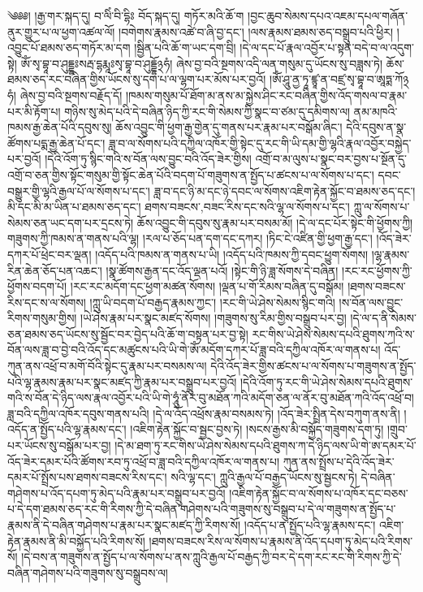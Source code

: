 ༄༅༅། །རྒྱ་གར་སྐད་དུ། བ་ལིཾ་བི་དྷིཿ བོད་སྐད་དུ། གཏོར་མའི་ཆོ་ག །བྱང་ཆུབ་སེམས་དཔའ་འཇམ་དཔལ་གཞོན་ནུར་གྱུར་པ་ལ་ཕྱག་འཚལ་ལོ། །བགེགས་རྣམས་འཚེ་བ་ཞི་བྱ་དང་། །ལས་རྣམས་ཐམས་ཅད་བསྒྲུབ་པའི་ཕྱིར། །འབྱུང་པོ་ཐམས་ཅད་གཏོར་མ་དག །སྦྱིན་པའི་ཆོ་ག་ཡང་དག་བྲི། །དེ་ལ་དང་པོ་རྣལ་འབྱོར་པ་སྟན་བདེ་བ་ལ་འདུག་སྟེ། ཨོཾ་སྭ་བྷཱ་བ་ཤུདྡྷཿསརྦ་དྷརྨཱཿསྭ་བྷཱ་བ་ཤུདྡྷོ྅ཧཾ། ཞེས་བྱ་བའི་སྔགས་འདི་ལན་གསུམ་དུ་ཡོངས་སུ་བཟླས་ཏེ། ཆོས་ཐམས་ཅད་རང་བཞིན་གྱིས་ཡོངས་སུ་དག་པ་ལ་ལྷག་པར་མོས་པར་བྱའོ། །ཨོཾ་ཤཱུ་ནྱ་ཏཱ་ཛྙཱ་ན་བཛྲ་སྭ་བྷཱ་བ་ཨཱཏྨ་ཀོ྅ཧཾ། ཞེས་བྱ་བའི་སྔགས་བརྗོད་དོ། །ཁམས་གསུམ་པོ་ཐོག་མ་ནས་མ་སྐྱེས་ཤིང་རང་བཞིན་གྱིས་འོད་གསལ་བ་རྣམ་པར་མི་རྟོག་པ། གཉིས་སུ་མེད་པའི་དེ་བཞིན་ཉིད་ཀྱི་རང་གི་སེམས་ཀྱི་སྣང་བ་ཙམ་དུ་དམིགས་ལ། ནམ་མཁའི་ཁམས་རྒྱ་ཆེན་པོའི་དབུས་སུ། ཆོས་འབྱུང་གི་ཕྱག་རྒྱ་གྱེན་དུ་གནས་པར་རྣམ་པར་བསྒོམ་ཞིང་། དེའི་དབུས་ན་སྣ་ཚོགས་པདྨ་རྒྱ་ཆེན་པོ་དང་། ཟླ་བ་ལ་སོགས་པའི་དཀྱིལ་འཁོར་གྱི་སྟེང་དུ་རང་གི་ཡི་དམ་གྱི་ལྷའི་རྣལ་འབྱོར་བསྐྱེད་པར་བྱའོ། །དེའི་འོག་ཏུ་སྙིང་གའི་ས་བོན་ལས་བྱུང་བའི་འོད་ཟེར་གྱིས། འགྲོ་བ་མ་ལུས་པ་སྣང་བར་བྱས་པ་སྔོན་དུ་འགྲོ་བ་ཅན་གྱིས་སྟོང་གསུམ་གྱི་སྟོང་ཆེན་པོའི་བདག་པོ་གཟུགས་ན་སྤྱོད་པ་ཚངས་པ་ལ་སོགས་པ་དང་། དབང་བསྒྱུར་གྱི་ལྷའི་རྒྱལ་པོ་ལ་སོགས་པ་དང་། ཟླ་བ་དང་ཉི་མ་དང་ཉེ་དབང་ལ་སོགས་འཇིག་རྟེན་སྐྱོང་བ་ཐམས་ཅད་དང་། མི་དང་མི་མ་ཡིན་པ་ཐམས་ཅད་དང་། ཐགས་{བཟངས་,བཟང་}རིས་དང་སའི་ལྷ་ལ་སོགས་པ་དང་། ཀླུ་ལ་སོགས་པ་སེམས་ཅན་ཡང་དག་པར་དྲངས་ཏེ། ཆོས་འབྱུང་གི་དབུས་སུ་རྣམ་པར་བསམ་མོ། །དེ་ལ་དང་པོར་སྟེང་གི་ཕྱོགས་ཀྱི། གཟུགས་ཀྱི་ཁམས་ན་གནས་པའི་ལྷ། །རལ་པ་ཅོད་པན་དག་དང་དཀར། །ཏིང་ངེ་འཛིན་གྱི་ཕྱག་རྒྱ་དང་། །འོད་ཟེར་དཀར་པོ་ཕྲེང་བར་ལྡན། །འདོད་པའི་ཁམས་ན་གནས་པ་ཡི། །འདོད་པའི་ཁམས་ཀྱི་དབང་ཕྱུག་སོགས། །ལྷ་རྣམས་རིན་ཆེན་ཅོད་པན་འཆང་། །སྣ་ཚོགས་རྒྱན་དང་འོད་ལྡན་པའོ། །སྟེང་གི་ཉི་ཟླ་སོགས་དེ་བཞིན། །རང་རང་ཕྱོགས་ཀྱི་ཕྱོགས་བདག་པོ། །རང་རང་མདོག་དང་ཕྱག་མཚན་སོགས། །ལྡན་པ་གོ་རིམས་བཞིན་དུ་བསྒོམ། །ཐགས་བཟངས་རིས་དང་ས་ལ་སོགས། །ཀླུ་ཡི་བདག་པོ་བརྒྱད་རྣམས་ཀྱང་། །རང་གི་ཡེ་ཤེས་སེམས་སྙིང་གའི། །ས་བོན་ལས་བྱུང་རིགས་གསུམ་གྱིས། །ཡེ་ཤེས་རྣམ་པར་སྣང་མཛད་སོགས། །གཟུགས་སུ་རིམ་གྱིས་བསྒྲུབ་པར་བྱ། །དེ་ལ་ད་ནི་སེམས་ཅན་ཐམས་ཅད་ཡོངས་སུ་སྦྱོང་བར་བྱེད་པའི་ཆོ་ག་བསྟན་པར་བྱ་སྟེ། རང་གིས་ཡེ་ཤེས་སེམས་དཔའི་ཐུགས་ཀའི་ས་བོན་ལས་ཟླ་བ་བྱེ་བའི་འོད་དང་མཚུངས་པའི་ཡི་གེ་ཨོཾ་མདོག་དཀར་པོ་ཟླ་བའི་དཀྱིལ་འཁོར་ལ་གནས་པ། འོད་ཀུན་ནས་འཕྲོ་བ་མགོ་བོའི་སྟེང་དུ་རྣམ་པར་བསམས་ལ། དེའི་འོད་ཟེར་གྱིས་ཚངས་པ་ལ་སོགས་པ་གཟུགས་ན་སྤྱོད་པའི་ལྷ་རྣམས་རྣམ་པར་སྣང་མཛད་ཀྱི་རྣམ་པར་བསྒྲུབ་པར་བྱའོ། །དེའི་འོག་ཏུ་རང་གི་ཡེ་ཤེས་སེམས་དཔའི་ཐུགས་གའི་ས་བོན་དེ་ཉིད་ལས་རྣལ་འབྱོར་པའི་ཡི་གེ་ཧཱུཾ་ནོར་བུ་མཐོན་ཀའི་མདོག་ཅན་ལ་ནོར་བུ་མཐོན་ཀའི་འོད་འཕྲོ་བ། ཟླ་བའི་དཀྱིལ་འཁོར་དབུས་གནས་པའི། །དེ་ལ་འོད་འཕྲོས་རྣམ་བསམས་ཏེ། །འོད་ཟེར་སྤྲིན་དེས་བཀུག་ནས་ནི། །འདོད་ན་སྤྱོད་པའི་ལྷ་རྣམས་དང་། །འཇིག་རྟེན་སྐྱོང་བ་སྦྱང་བྱས་ཏེ། །སངས་རྒྱས་མི་བསྐྱོད་གཟུགས་དག་ཏུ། །གྲུབ་པར་ཡོངས་སུ་བསྒོམ་པར་བྱ། །དེ་མ་ཐག་ཏུ་རང་གིས་ཡེ་ཤེས་སེམས་དཔའི་ཐུགས་ཀ་དེ་ཉིད་ལས་ཡི་གེ་ཨ་དམར་པོ་འོད་ཟེར་དམར་པོའི་ཚོགས་རབ་ཏུ་འཕྲོ་བ་ཟླ་བའི་དཀྱིལ་འཁོར་ལ་གནས་པ། ཀུན་ནས་སྤྲོས་པ་དེའི་འོད་ཟེར་དམར་པོ་སྤྲོས་པས་ཐགས་བཟངས་རིས་དང་། སའི་ལྷ་དང་། ཀླུའི་རྒྱལ་པོ་བརྒྱད་ཡོངས་སུ་སྦྱངས་ཏེ། དེ་བཞིན་གཤེགས་པ་འོད་དཔག་ཏུ་མེད་པའི་རྣམ་པར་བསྒྲུབ་པར་བྱའོ། །འཇིག་རྟེན་སྐྱོང་བ་ལ་སོགས་པ་འཁོར་དང་བཅས་པ་དེ་དག་ཐམས་ཅད་རང་གི་རིགས་ཀྱི་དེ་བཞིན་གཤེགས་པའི་གཟུགས་སུ་བསྒྲུབ་པ་དེ་ལ་གཟུགས་ན་སྤྱོད་པ་རྣམས་ནི་དེ་བཞིན་གཤེགས་པ་རྣམ་པར་སྣང་མཛད་ཀྱི་རིགས་སོ། །འདོད་པ་ན་སྤྱོད་པའི་ལྷ་རྣམས་དང་། འཇིག་རྟེན་རྣམས་ནི་མི་བསྐྱོད་པའི་རིགས་སོ། །ཐགས་བཟངས་རིས་ལ་སོགས་པ་རྣམས་ནི་འོད་དཔག་ཏུ་མེད་པའི་རིགས་སོ། །དེ་བས་ན་གཟུགས་ན་སྤྱོད་པ་ལ་སོགས་པ་ནས་ཀླུའི་རྒྱལ་པོ་བརྒྱད་ཀྱི་བར་དེ་དག་རང་རང་གི་རིགས་ཀྱི་དེ་བཞིན་གཤེགས་པའི་གཟུགས་སུ་བསྒྲུབས་ལ། 